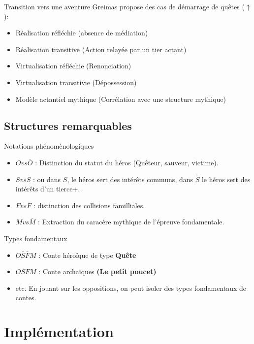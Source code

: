 \documentclass{beamer}
\begin{document}
\begin{frame}{Transition vers une aventure}
  Greimas propose des cas de démarrage de quêtes ($\uparrow$):
  \begin{itemize}
    \item Réalisation réfléchie (absence de médiation)
    \item Réalisation transitive (Action relayée par un tier actant)
    \item Virtualisation réfléchie (Renonciation)
    \item Virtualisation transitivie (Dépossession)
    \item Modèle actantiel mythique (Corrélation avec une structure mythique)
  \end{itemize}
\end{frame}

\subsection{Structures remarquables}
\begin{frame}{Notations phénomènologiques}
  \begin{itemize}
    \item $O vs \bar{O}$ : Distinction du statut du héros (Quêteur, sauveur, victime).
    \item $S vs \bar{S}$ : ou dans $S$, le héros sert des intérêts communs, dans $\bar{S}$ le héros sert des intérêts d'un tierce+.
    \item $F vs \bar{F}$ : distinction des collisions familliales.
    \item $M vs \bar{M}$ : Extraction du caracère mythique de l'épreuve fondamentale.
  \end{itemize}
\end{frame}

\begin{frame}{Types fondamentaux}
  \begin{itemize}
    \item $O\bar{S}\bar{F}M$ : Conte héroïque de type \textbf{Quête}
    \item $\bar{O}S\bar{F}M$ : Conte archaïques \textbf{(Le petit poucet)}
    \item etc. En jouant sur les oppositions, on peut isoler des types fondamentaux de contes.
  \end{itemize}
\end{frame}

\section{Implémentation}
\end{document}
